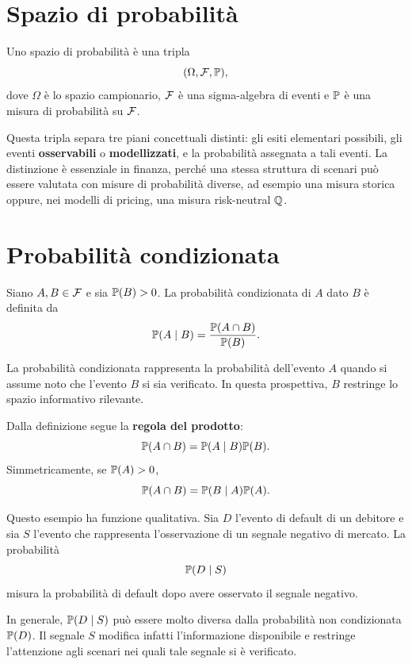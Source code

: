 \section{Spazio di probabilit\`{a}}

\begin{definition}
Uno spazio di probabilit\`{a} \`{e} una tripla
\[
(\Omega,\mathcal{F},\mathbb{P}),
\]
dove $\Omega$ \`{e} lo spazio campionario, $\mathcal{F}$ \`{e} una
sigma-algebra di eventi e $\mathbb{P}$ \`{e} una misura di probabilit\`{a} su
$\mathcal{F}$.
\end{definition}

Questa tripla separa tre piani concettuali distinti: gli esiti elementari possibili,
gli eventi \textbf{osservabili} o \textbf{modellizzati}, e la probabilit\`{a} assegnata a tali
eventi. La distinzione \`{e} essenziale in finanza, perch\'{e} una stessa
struttura di scenari pu\`{o} essere valutata con misure di probabilit\`{a}
diverse, ad esempio una misura storica oppure, nei modelli di pricing, una
misura risk-neutral $\mathbb{Q}$.

\section{Probabilit\`{a} condizionata}

\begin{definition}
Siano $A,B\in\mathcal{F}$ e sia $\mathbb{P}(B)>0$. La probabilit\`{a}
condizionata di $A$ dato $B$ \`{e} definita da
\[
\mathbb{P}(A\mid B)=\frac{\mathbb{P}(A\cap B)}{\mathbb{P}(B)}.
\]

\end{definition}

La probabilit\`{a} condizionata rappresenta la probabilit\`{a} dell'evento $A$
quando si assume noto che l'evento $B$ si sia verificato. In questa
prospettiva, $B$ restringe lo spazio informativo rilevante.

Dalla definizione segue la \textbf{regola del prodotto}:
\[
\mathbb{P}(A\cap B)=\mathbb{P}(A\mid B)\mathbb{P}(B).
\]
Simmetricamente, se $\mathbb{P}(A)>0$,
\[
\mathbb{P}(A\cap B)=\mathbb{P}(B\mid A)\mathbb{P}(A).
\]


\begin{example}
Questo esempio ha funzione qualitativa. Sia $D$ l'evento di default di un
debitore e sia $S$ l'evento che rappresenta l'osservazione di un segnale
negativo di mercato. La probabilit\`{a}
\[
\mathbb{P}(D\mid S)
\]
misura la probabilit\`{a} di default dopo avere osservato il segnale negativo.

In generale, $\mathbb{P}(D\mid S)$ pu\`{o} essere molto diversa dalla
probabilit\`{a} non condizionata $\mathbb{P}(D)$. Il segnale $S$ modifica
infatti l'informazione disponibile e restringe l'attenzione agli scenari nei
quali tale segnale si \`{e} verificato.
\end{example}

